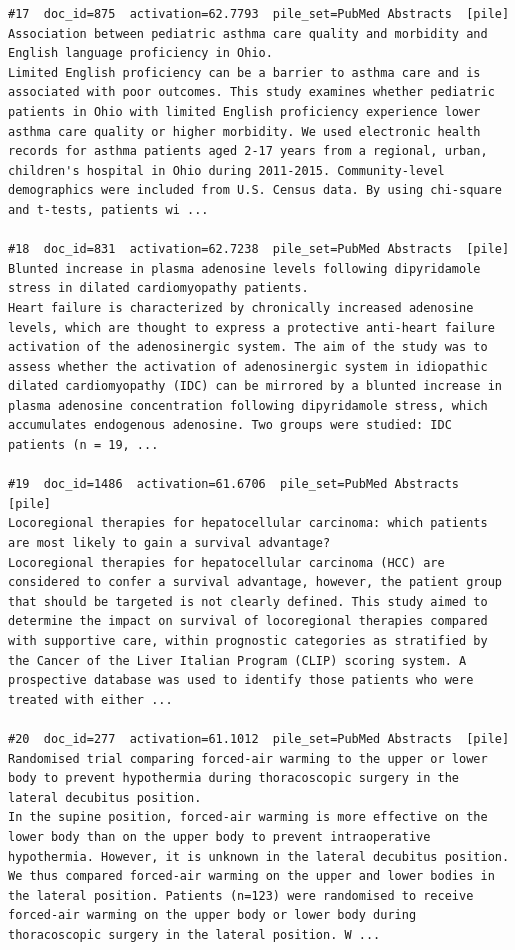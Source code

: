\begin{verbatim}
#17  doc_id=875  activation=62.7793  pile_set=PubMed Abstracts  [pile]
Association between pediatric asthma care quality and morbidity and English language proficiency in Ohio.
Limited English proficiency can be a barrier to asthma care and is associated with poor outcomes. This study examines whether pediatric patients in Ohio with limited English proficiency experience lower asthma care quality or higher morbidity. We used electronic health records for asthma patients aged 2-17 years from a regional, urban, children's hospital in Ohio during 2011-2015. Community-level demographics were included from U.S. Census data. By using chi-square and t-tests, patients wi ...

#18  doc_id=831  activation=62.7238  pile_set=PubMed Abstracts  [pile]
Blunted increase in plasma adenosine levels following dipyridamole stress in dilated cardiomyopathy patients.
Heart failure is characterized by chronically increased adenosine levels, which are thought to express a protective anti-heart failure activation of the adenosinergic system. The aim of the study was to assess whether the activation of adenosinergic system in idiopathic dilated cardiomyopathy (IDC) can be mirrored by a blunted increase in plasma adenosine concentration following dipyridamole stress, which accumulates endogenous adenosine. Two groups were studied: IDC patients (n = 19, ...

#19  doc_id=1486  activation=61.6706  pile_set=PubMed Abstracts  [pile]
Locoregional therapies for hepatocellular carcinoma: which patients are most likely to gain a survival advantage?
Locoregional therapies for hepatocellular carcinoma (HCC) are considered to confer a survival advantage, however, the patient group that should be targeted is not clearly defined. This study aimed to determine the impact on survival of locoregional therapies compared with supportive care, within prognostic categories as stratified by the Cancer of the Liver Italian Program (CLIP) scoring system. A prospective database was used to identify those patients who were treated with either ...

#20  doc_id=277  activation=61.1012  pile_set=PubMed Abstracts  [pile]
Randomised trial comparing forced-air warming to the upper or lower body to prevent hypothermia during thoracoscopic surgery in the lateral decubitus position.
In the supine position, forced-air warming is more effective on the lower body than on the upper body to prevent intraoperative hypothermia. However, it is unknown in the lateral decubitus position. We thus compared forced-air warming on the upper and lower bodies in the lateral position. Patients (n=123) were randomised to receive forced-air warming on the upper body or lower body during thoracoscopic surgery in the lateral position. W ...

\end{verbatim}

